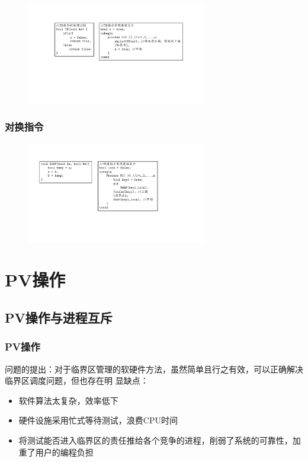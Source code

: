\documentclass[cs4size,a4paper,10pt]{ctexart}
\begin{document}
	\begin{figure}[H]
		\centering
		\includegraphics[width=0.7\textwidth]{img/TS指令.pdf}
	\end{figure}

	\subsubsection{对换指令}
	\begin{figure}[H]
		\centering
		\includegraphics[width=0.7\textwidth]{img/对换指令.pdf}
	\end{figure}

	\section{PV操作}

	\subsection{PV操作与进程互斥}

	\subsubsection{PV操作}

	问题的提出：对于临界区管理的软硬件方法，虽然简单且行之有效，可以正确解决临界区调度问题，但也存在明
	显缺点：
	\begin{itemize}
		\item 软件算法太复杂，效率低下
		\item 硬件设施采用忙式等待测试，浪费CPU时间
		\item 将测试能否进入临界区的责任推给各个竞争的进程，削弱了系统的可靠性，加重了用户的编程负担
	\end{itemize}
\end{document}
